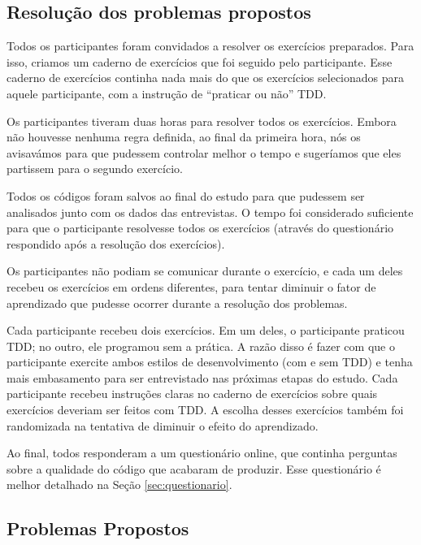 \subsection{Resolução dos problemas propostos}
\label{sec:execucao}	

Todos os participantes foram convidados a resolver os exercícios preparados. 
Para isso, criamos um caderno de exercícios que foi seguido pelo participante.
Esse caderno de exercícios continha nada mais do que os exercícios selecionados
para aquele participante, com a instrução de ``praticar ou não'' TDD.

Os participantes tiveram duas horas para resolver todos os exercícios. Embora
não houvesse nenhuma regra definida, ao final da primeira hora, nós os
avisavámos para que pudessem controlar melhor o tempo e sugeríamos que eles 
partissem para o segundo exercício. 

Todos os códigos foram salvos ao final do estudo para que pudessem ser 
analisados junto com os dados das entrevistas.
O tempo foi considerado suficiente para que o participante resolvesse todos os
exercícios (através do questionário respondido após a resolução dos exercícios). 

Os participantes não podiam se comunicar durante o exercício, e cada um deles recebeu
os exercícios em ordens diferentes, para tentar diminuir o fator de aprendizado que 
pudesse ocorrer durante a resolução dos problemas. 

Cada participante recebeu dois exercícios. Em um deles, o participante praticou TDD; no outro,
ele programou sem a prática. A razão disso
é fazer com que o participante exercite ambos estilos de desenvolvimento (com e sem TDD)
e tenha mais embasamento para ser entrevistado nas próximas etapas do estudo. 
Cada participante recebeu instruções claras no caderno de exercícios 
sobre quais exercícios deveriam ser feitos
com TDD. A escolha desses exercícios também foi randomizada na tentativa de diminuir
o efeito do aprendizado.

Ao final, todos responderam a um questionário online, 
que continha perguntas sobre a qualidade
do código que acabaram de produzir. Esse questionário
é melhor detalhado na Seção \ref{sec:questionario}.

\subsection{Problemas Propostos}
\label{sec:exercicios}


